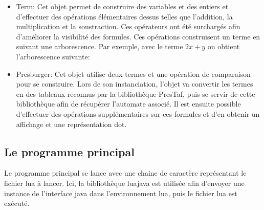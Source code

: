 \begin{itemize}
	\item Term: Cet objet permet de construire des variables et des entiers et d’effectuer des opérations élémentaires dessus telles que l’addition, la multiplication et la soustraction. Ces opérateurs ont été surchargés afin d’améliorer la visibilité des formules. Ces opérations construisent un terme en suivant une arborescence. Par exemple, avec le terme $2x + y$ on obtient l’arborescence suivante:
	\begin{figure}[h]
		\centering
	\end{figure}

	\item Presburger: Cet objet utilise deux termes et une opération de comparaison pour se construire.
		Lors de son instanciation, l’objet va convertir les termes en des tableaux reconnus par la bibliothèque PresTaf, puis se servir de cette bibliothèque afin de récupérer l’automate associé. Il est ensuite possible d’effectuer des opérations supplémentaires sur ces formules et d’en obtenir un affichage et une représentation dot.

\end{itemize}

\subsection{Le programme principal}

Le programme principal se lance avec une chaine de caractère représentant le fichier lua à lancer. Ici, la bibliothèque luajava est utilisée afin d’envoyer une instance de l’interface java dans l’environnement lua, puis le fichier lua est exécuté.
